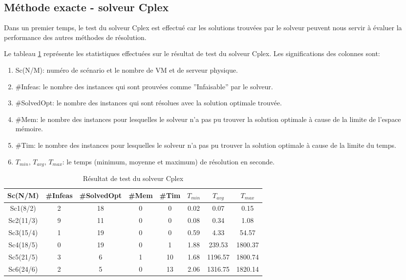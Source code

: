 \documentclass[twoside,fleqn]{EPURapport}
\begin{document}
\subsection{Méthode exacte - solveur Cplex}
Dans un premier temps, le test du solveur Cplex est effectué car les solutions trouvées par le solveur peuvent nous servir à évaluer la performance des autres méthodes de résolution.

 
Le tableau \ref{tab_cplex} représente les statistiques effectuées sur le résultat de test du solveur Cplex. Les significations des colonnes sont:
\begin{enumerate}
	\item Sc(N/M): numéro de scénario et le nombre de VM et de serveur physique.
	\item \#Infeas: le nombre des instances qui sont prouvées comme ''Infaisable'' par le solveur.
	\item \#SolvedOpt: le nombre des instances qui sont résolues avec la solution optimale trouvée.
	\item \#Mem: le nombre des instances pour lesquelles le solveur n'a pas pu trouver la solution optimale à cause de la limite de l'espace mémoire.
	\item \#Tim: le nombre des instances pour lesquelles le solveur n'a pas pu trouver la solution optimale à cause de la limite du temps.
	\item $T_{min}$, $T_{avg}$, $T_{max}$: le temps (minimum, moyenne et maximum) de résolution en seconde.
\end{enumerate}
\bigskip


\begin{table}[h]
    \centering
    \begin{tabular}{|c|c|c|c|c|c|c|c|}
    	\hline
    	Sc(N/M)	& \#Infeas & \#SolvedOpt	& \#Mem & \#Tim & $T_{min}$ & $T_{avg}$	& $T_{max}$ \\ \hline
		Sc1(8/2) & 2 & 18 & 0 & 0 &  0.02 &  0.07 &  0.15 \\ \hline
		Sc2(11/3) & 9 & 11 & 0 & 0 &  0.08 &  0.34 &  1.08 \\ \hline
		Sc3(15/4) & 1 & 19 & 0 & 0 &  0.59 &  4.33 &  54.57 \\ \hline
		Sc4(18/5) & 0 & 19 & 0 & 1 &  1.88 &  239.53 &  1800.37 \\ \hline
		Sc5(21/5) & 3 & 6 & 1 & 10 &  1.68 &  1196.57 &  1800.74 \\ \hline
		Sc6(24/6) & 2 & 5 & 0 & 13 &  2.06 &  1316.75 &  1820.14 \\	\hline
    \end{tabular}
    \label{tab_cplex}
    \caption{Résultat de test du solveur Cplex}
\end{table}
\bigskip
\end{document}
